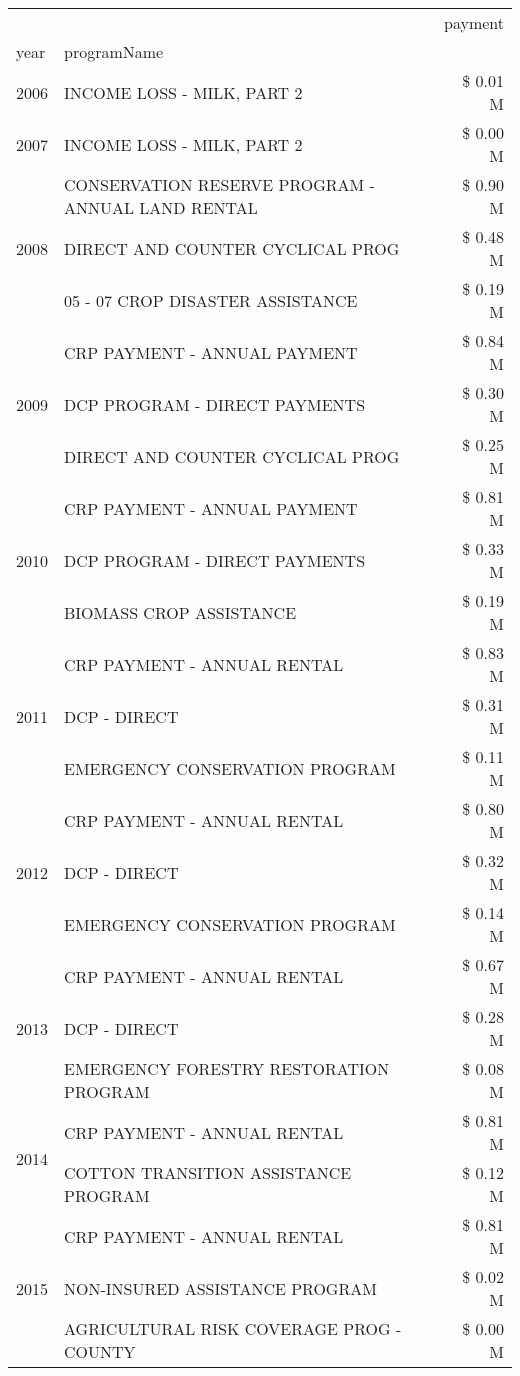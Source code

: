 \begin{tabular}{llr}
\toprule
 &  & payment \\
year & programName &  \\
\midrule
2006 & INCOME LOSS - MILK, PART 2 & \$ 0.01 M \\
\cline{1-3}
2007 & INCOME LOSS - MILK, PART 2 & \$ 0.00 M \\
\cline{1-3}
\multirow[t]{3}{*}{2008} & CONSERVATION RESERVE PROGRAM - ANNUAL LAND RENTAL & \$ 0.90 M \\
 & DIRECT AND COUNTER CYCLICAL PROG & \$ 0.48 M \\
 & 05 - 07 CROP DISASTER ASSISTANCE & \$ 0.19 M \\
\cline{1-3}
\multirow[t]{3}{*}{2009} & CRP PAYMENT - ANNUAL PAYMENT & \$ 0.84 M \\
 & DCP PROGRAM - DIRECT PAYMENTS & \$ 0.30 M \\
 & DIRECT AND COUNTER CYCLICAL PROG & \$ 0.25 M \\
\cline{1-3}
\multirow[t]{3}{*}{2010} & CRP PAYMENT - ANNUAL PAYMENT & \$ 0.81 M \\
 & DCP PROGRAM - DIRECT PAYMENTS & \$ 0.33 M \\
 & BIOMASS CROP ASSISTANCE & \$ 0.19 M \\
\cline{1-3}
\multirow[t]{3}{*}{2011} & CRP PAYMENT - ANNUAL RENTAL & \$ 0.83 M \\
 & DCP - DIRECT & \$ 0.31 M \\
 & EMERGENCY CONSERVATION PROGRAM & \$ 0.11 M \\
\cline{1-3}
\multirow[t]{3}{*}{2012} & CRP PAYMENT - ANNUAL RENTAL & \$ 0.80 M \\
 & DCP - DIRECT & \$ 0.32 M \\
 & EMERGENCY CONSERVATION PROGRAM & \$ 0.14 M \\
\cline{1-3}
\multirow[t]{3}{*}{2013} & CRP PAYMENT - ANNUAL RENTAL & \$ 0.67 M \\
 & DCP - DIRECT & \$ 0.28 M \\
 & EMERGENCY FORESTRY RESTORATION PROGRAM & \$ 0.08 M \\
\cline{1-3}
\multirow[t]{2}{*}{2014} & CRP PAYMENT - ANNUAL RENTAL & \$ 0.81 M \\
 & COTTON TRANSITION ASSISTANCE PROGRAM & \$ 0.12 M \\
\cline{1-3}
\multirow[t]{3}{*}{2015} & CRP PAYMENT - ANNUAL RENTAL & \$ 0.81 M \\
 & NON-INSURED ASSISTANCE PROGRAM & \$ 0.02 M \\
 & AGRICULTURAL RISK COVERAGE PROG - COUNTY & \$ 0.00 M \\

\end{tabular}

